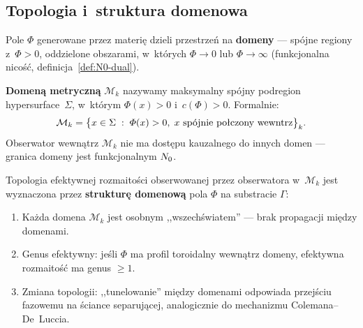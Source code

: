 \subsection{Topologia i~struktura domenowa}\label{ssec:topologia}

Pole $\Phi$ generowane przez materi\k{e} dzieli przestrze\'n na
\textbf{domeny} --- sp\'ojne regiony z~$\Phi > 0$, oddzielone
obszarami, w~kt\'orych $\Phi \to 0$ lub $\Phi \to \infty$
(funkcjonalna nico\'s\'c, definicja~\ref{def:N0-dual}).

\begin{definition}\label{def:domena}
\textbf{Domen\k{a} metryczn\k{a}} $\mathcal{M}_k$ nazywamy
maksymalny sp\'ojny podregion hypersurface~$\Sigma$, w~kt\'orym
$\Phi(x) > 0$ i~$c(\Phi) > 0$. Formalnie:
\begin{equation}\label{eq:domena}
    \mathcal{M}_k = \bigl\{x \in \Sigma \;:\;
    \Phi(x) > 0,\;
    x \text{ sp\'ojnie po\l{}\k{a}czony wewn\k{a}trz}\bigr\}_k.
\end{equation}
Obserwator wewn\k{a}trz $\mathcal{M}_k$ nie ma dost\k{e}pu
kauzalnego do innych domen --- granica domeny jest
funkcjonalnym $N_0$.
\end{definition}

\begin{hypothesis}\label{hyp:topologia}
Topologia efektywnej rozmaito\'sci obserwowanej przez
obserwatora w~$\mathcal{M}_k$ jest wyznaczona przez
\textbf{struktur\k{e} domenow\k{a}} pola $\Phi$ na substracie $\Gamma$:
\begin{enumerate}[nosep]
  \item Ka\.zda domena $\mathcal{M}_k$ jest osobnym
        ,,wszech\'swiatem'' --- brak propagacji mi\k{e}dzy domenami.
  \item Genus efektywny: je\'sli $\Phi$ ma profil toroidalny
        wewn\k{a}trz domeny, efektywna rozmaito\'s\'c ma
        genus $\geq 1$.
  \item Zmiana topologii: ,,tunelowanie'' mi\k{e}dzy domenami
        odpowiada przej\'sciu fazowemu na \'sciance separuj\k{a}cej,
        analogicznie do mechanizmu Colemana--De~Luccia.
\end{enumerate}
\end{hypothesis}

